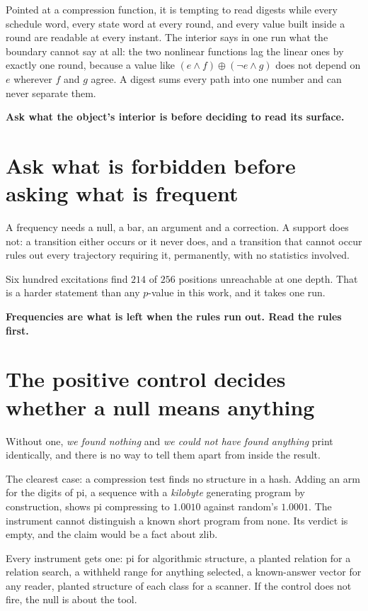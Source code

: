 Pointed at a compression function, it is tempting to read digests while every schedule word, every state word at every round, and every value built inside a round are readable at every instant. The interior says in one run what the boundary cannot say at all: the two nonlinear functions lag the linear ones by exactly one round, because a value like \((e \wedge f) \oplus (\neg e \wedge g)\) does not depend on \(e\) wherever \(f\) and \(g\) agree. A digest sums every path into one number and can never separate them.

\textbf{Ask what the object's interior is before deciding to read its surface.}

\section{Ask what is forbidden before asking what is frequent}

A frequency needs a null, a bar, an argument and a correction. A support does not: a transition either occurs or it never does, and a transition that cannot occur rules out every trajectory requiring it, permanently, with no statistics involved.

Six hundred excitations find \(214\) of \(256\) positions unreachable at one depth. That is a harder statement than any \(p\)-value in this work, and it takes one run.

\textbf{Frequencies are what is left when the rules run out. Read the rules first.}

\section{The positive control decides whether a null means anything}

Without one, \emph{we found nothing} and \emph{we could not have found anything} print identically, and there is no way to tell them apart from inside the result.

The clearest case: a compression test finds no structure in a hash. Adding an arm for the digits of pi, a sequence with a \emph{kilobyte} generating program by construction, shows pi compressing to \(1.0010\) against random's \(1.0001\). The instrument cannot distinguish a known short program from none. Its verdict is empty, and the claim would be a fact about zlib.

Every instrument gets one: pi for algorithmic structure, a planted relation for a relation search, a withheld range for anything selected, a known-answer vector for any reader, planted structure of each class for a scanner. If the control does not fire, the null is about the tool.

